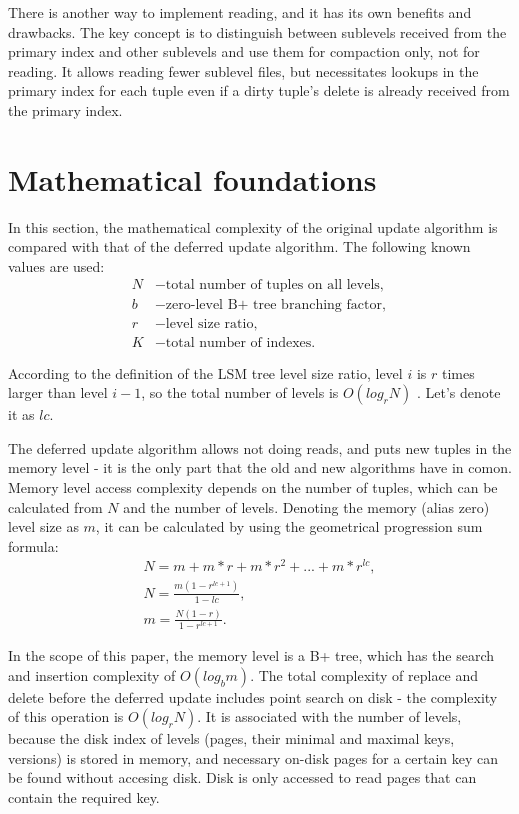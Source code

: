 \documentclass{vldb}
\begin{document}
There is another way to implement reading, and it has its own benefits and
drawbacks. The key concept is to distinguish between sublevels received
from the primary index and other sublevels and use them for compaction
only, not for reading. It allows reading fewer sublevel files, but necessitates
lookups in the primary index for each tuple even if a dirty tuple's delete is
already received from the primary index.

\section{Mathematical foundations}

In this section, the mathematical complexity of the original update algorithm is
compared with that of the deferred update algorithm. The following known
values are used:
\begin{align*}
N &- \text{total number of tuples on all levels}, \\
b &- \text{zero-level B+ tree branching factor}, \\
r &- \text{level size ratio}, \\
K &- \text{total number of indexes}.
\end{align*}

According to the definition of the LSM tree level size ratio, level $i$ is $r$ times
larger than level $i - 1$, so the total number of levels is $O(log_rN)$
\cite{kai:slimdb}. Let's denote it as $lc$.

The deferred update algorithm allows not doing reads, and puts new tuples in the
memory level - it is the only part that the old and new algorithms have in comon.
Memory level access complexity depends on the number of tuples, which can be
calculated from $N$ and the number of levels. Denoting the memory (alias zero)
level size as $m$, it can be calculated by using the geometrical progression sum formula:
\begin{gather*}
N = m + m*r + m*r^2 + ... + m*r^{lc}, \\
N = \frac{m(1 - r^{lc+1})}{1 - lc}, \\
m = \frac{N(1 - r)}{1 - r^{lc + 1}}.
\end{gather*}

In the scope of this paper, the memory level is a B+ tree, which has the
search and insertion complexity of $O(log_bm)$. The total complexity of
replace and delete before the deferred update includes point search on
disk - the complexity of this operation is $O(log_rN)$. It is associated
with the number of levels, because the disk index of levels (pages, their minimal and
maximal keys, versions) is stored in memory, and necessary on-disk pages for a
certain key can be found without accesing disk. Disk is only accessed to read
pages that can contain the required key.
\end{document}
